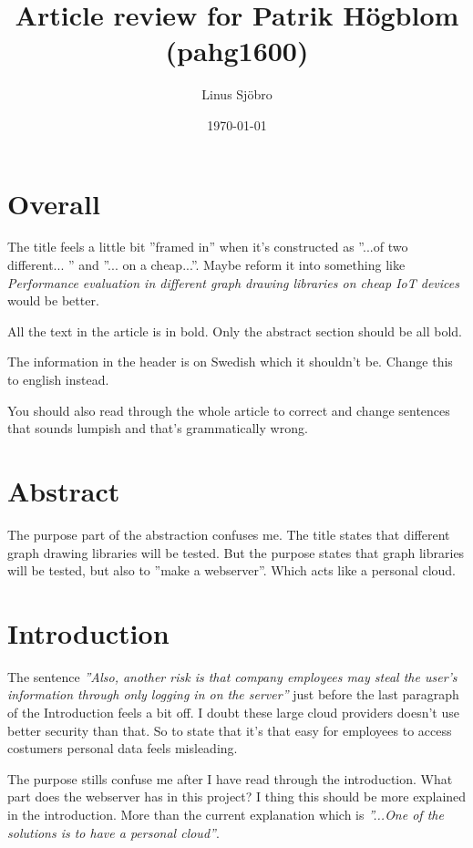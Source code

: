\documentclass[12pt]{article}
\title{Article review for Patrik Högblom (pahg1600)}
\author{Linus Sjöbro}
\date{\today}
\begin{document}
\maketitle

\section{Overall} \label{}
The title feels a little bit ''framed in'' when it's constructed as ''...of two different... '' and ''... on a cheap...''. Maybe reform it into something like \textit{Performance evaluation in different graph drawing libraries on cheap IoT devices} would be better.

\bigskip

All the text in the article is in bold. Only the abstract section should be all bold.

\bigskip

The information in the header is on Swedish which it shouldn't be. Change this to english instead.

\bigskip

You should also read through the whole article to correct and change sentences that sounds lumpish and that's grammatically wrong.

\section{Abstract} \label{}
The purpose part of the abstraction confuses me. The title states that different graph drawing libraries will be tested. But the purpose states that graph libraries will be tested, but also to ''make a webserver''. Which acts like a personal cloud. 

\section{Introduction} \label{}
The sentence \textit{''Also, another risk is that company employees may steal the user’s information through only logging in on the server''} just before the last paragraph of the Introduction feels a bit off. I doubt these large cloud providers doesn't use better security than that. So to state that it's that easy for employees to access costumers personal data feels misleading.

\bigskip

The purpose stills confuse me after I have read through the introduction. What part does the webserver has in this project? I thing this should be more explained in the introduction. More than the current explanation which is \textit{''...One of the solutions is to have a personal cloud''}.
\end{document}
